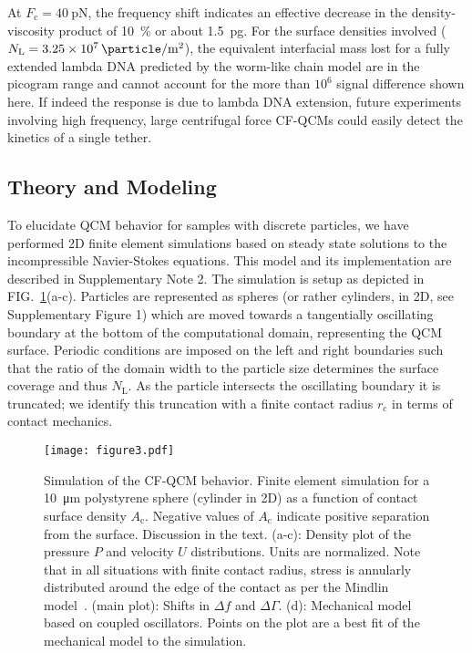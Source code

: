 \documentclass[floatfix,superscriptaddress,a4paper,twocolumn]{revtex4-1}
\newcommand{\Figure}[1]{FIG.~\ref{#1}}
\newcommand{\df}{\Delta\!f}
\newcommand{\dg}{\Delta\Gamma}
\newcommand{\todo}[1]{%
\textcolor{tangoorange}{#1}
}
\begin{document}
At $F_\mathrm{c}=\SI{40}{\pico\newton}$, the frequency shift indicates an
effective decrease in the density-viscosity product of \SI{10}{\percent} or
about \SI{1.5}{\pico\gram}.  For the surface densities involved
($N_\mathrm{L}=\SI{3.25e7}{\particle\per\meter\squared}$), the equivalent
interfacial mass lost for a fully extended lambda DNA predicted by the
worm-like chain model are in the picogram range and cannot account for the
more than $10^6$ signal difference shown here.  If indeed the response is
due to lambda DNA extension, future experiments involving high frequency,
large centrifugal force CF-QCMs could easily detect the kinetics of a
single tether.

\subsection*{Theory and Modeling}
\label{sec:theoryandmodeling}
To elucidate QCM behavior for samples with discrete particles, we have
performed 2D finite element simulations based on steady state solutions to
the incompressible Navier-Stokes equations.  This model and its
implementation are described in Supplementary Note 2.  The
simulation is setup as depicted in \mbox{\Figure{fig:lowersphere}(a-c)}.  Particles
are represented as spheres (or rather cylinders, in 2D, see Supplementary
Figure 1) which are moved
towards a tangentially oscillating boundary at the bottom of the
computational domain, representing the QCM surface.  Periodic conditions
are imposed on the left and right boundaries such that the ratio of the
domain width to the particle size determines the surface coverage and thus
$N_\mathrm{L}$.  As the particle intersects the oscillating boundary it is
truncated; we identify this truncation with a finite contact radius
$r_\mathrm{c}$ in terms of contact mechanics.
\begin{figure}[ht]
\centering
\texttt{[image: figure3.pdf]}
\caption{%
Simulation of the CF-QCM behavior.
Finite element simulation for a \SI{10}{\micro\meter} polystyrene
sphere (cylinder in 2D) as a function of contact surface density 
$A_\mathrm{c}$.  Negative values of $A_\mathrm{c}$ indicate positive
separation from the surface.  Discussion in the text. (a-c): Density plot
of the pressure $P$ and velocity $U$ distributions. Units are normalized.
Note that in all situations with finite contact radius, 
stress is annularly distributed around the edge of the contact as per the
Mindlin model~\cite{kumacheva1998interfacial}.
(main plot): Shifts in $\df$ and $\dg$.
(d): Mechanical model based on coupled oscillators. Points on the plot are
a best fit of the mechanical model to the simulation.}
\label{fig:lowersphere}
\end{figure}
\end{document}
